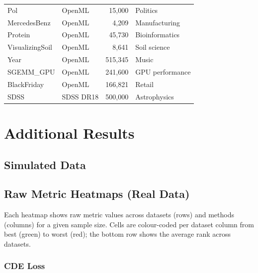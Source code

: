 \documentclass{article}
\begin{document}
\begin{table}[p]
\begin{tabular}{llrl}
Pol              & OpenML &   15{,}000 & Politics \\
MercedesBenz     & OpenML &    4{,}209 & Manufacturing \\
Protein          & OpenML &   45{,}730 & Bioinformatics \\
VisualizingSoil  & OpenML &    8{,}641 & Soil science \\
Year             & OpenML &  515{,}345 & Music \\
SGEMM\_GPU       & OpenML &  241{,}600 & GPU performance \\
BlackFriday      & OpenML &  166{,}821 & Retail \\
SDSS             & SDSS DR18 & 500{,}000 & Astrophysics \\
\bottomrule
\end{tabular}
\end{table}


\section{Additional Results}

\subsection{Simulated Data}


\subsection{Raw Metric Heatmaps (Real Data)}

Each heatmap shows raw metric values across datasets (rows) and methods
(columns) for a given sample size. Cells are colour-coded per dataset column
from best (green) to worst (red); the bottom row shows the average rank across
datasets.

\subsubsection{CDE Loss}
\end{document}
